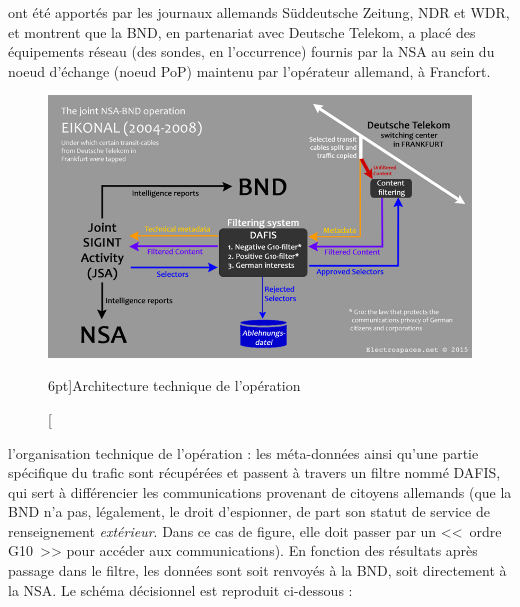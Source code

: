  ont été apportés par les journaux allemands
Süddeutsche Zeitung\autocite{sudde}, NDR et WDR\autocite{NDR}, et montrent que la BND,
en partenariat avec Deutsche Telekom, a placé des équipements réseau (des
sondes, en l'occurrence) fournis par la NSA au sein du noeud d'échange (noeud
PoP) maintenu par l'opérateur allemand, à Francfort.

\vspace{0.7cm}
\begin{figure}
\includegraphics{eikonal1.jpg}
\caption[Architecture de l'opération EIKONAL][6pt]{Architecture
technique de l'opération}
\label{fig:eikonal1}
\end{figure}

 l'organisation technique de l'opération : les
méta-données ainsi qu'une partie spécifique du trafic sont récupérées et passent
à travers un filtre nommé DAFIS\label{dafis}, qui sert à différencier les
communications provenant de citoyens allemands (que la BND n'a pas, légalement, le droit
d'espionner, de part son statut de service de renseignement \emph{extérieur}.
Dans ce cas de figure, elle doit passer par un <<~ordre G10~>> pour accéder
aux communications).
En fonction des résultats après passage dans le filtre, les données sont soit
renvoyés à la BND, soit directement à la NSA. Le schéma décisionnel est
reproduit ci-dessous :

